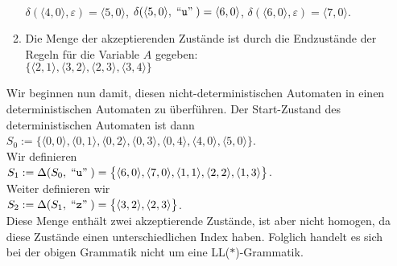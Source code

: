\documentclass{article}
\def\pair(#1,#2){\langle #1, #2 \rangle}
\newcommand{\quoted}[1]{\;\mbox{``\texttt{#1}''}\;}
\begin{document}
\begin{enumerate}
\begin{enumerate}
            \\[0.2cm]
            \hspace*{1.3cm}
            $\delta(\pair(4,0), \varepsilon) = \pair(5,0)$, \quad
            $\delta(\pair(5,0), \quoted{u})  = \pair(6,0)$, \quad
            $\delta(\pair(6,0), \varepsilon) = \pair(7,0)$.
      \item Die Menge der akzeptierenden Zust\"ande ist durch die Endzust\"ande der Regeln f\"ur
            die Variable $A$ gegeben:
            \\[0.2cm]
            \hspace*{1.3cm}
            $\bigl\{ \pair(2,1), \pair(3,2), \pair(2,3), \pair(3,4) \bigr\}$
      \end{enumerate}
      Wir beginnen nun damit, diesen nicht-deterministischen Automaten in einen deterministischen 
      Automaten zu \"uberf\"uhren.  Der Start-Zustand des deterministischen  Automaten ist dann
      \\[0.2cm]
      \hspace*{1.3cm}
      $S_0 := 
       \bigl\{ \pair(0,0), \pair(0,1), \pair(0,2), \pair(0,3), \pair(0,4), \pair(4,0), \pair(5,0) \bigr\}$.
      \\[0.2cm]
      Wir definieren
      \\[0.2cm]
      \hspace*{1.3cm}
      $S_1 := \Delta(S_0, \quoted{u}) = 
      \bigl\{ \pair(6,0), \pair(7,0), \pair(1,1), \pair(2,2), \pair(1,3) \bigr\}$.
      \\[0.2cm]
      Weiter definieren wir
      \\[0.2cm]
      \hspace*{1.3cm}
      $S_2 := \Delta(S_1, \quoted{z}) = \bigl\{ \pair(3,2), \pair(2,3) \bigr\}$.
      \\[0.2cm]
      Diese Menge enth\"alt zwei akzeptierende Zust\"ande, ist aber nicht homogen, da diese
      Zust\"ande einen unterschiedlichen Index haben.  Folglich handelt es sich bei der obigen Grammatik
      nicht um eine LL($*$)-Grammatik.


\end{enumerate}
\end{document}
